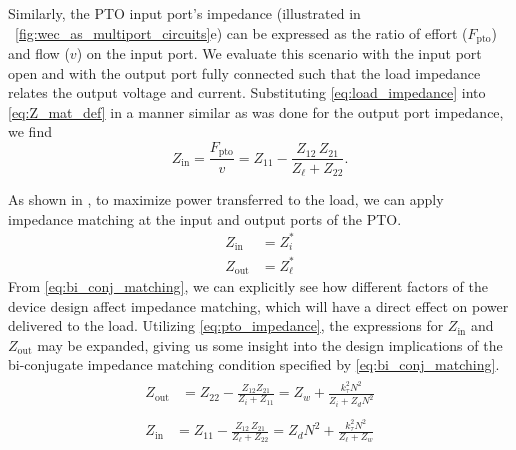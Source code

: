 \documentclass[twocolumn]{autart}
\begin{document}
Similarly, the PTO input port's impedance (illustrated in \figurename~\ref{fig:wec_as_multiport_circuits}e) can be expressed as the ratio of effort ($F_{\textrm{pto}}$) and flow ($v$) on the input port.
We evaluate this scenario with the input port open and with the output port fully connected such that the load impedance relates the output voltage and current.
Substituting \eqref{eq:load_impedance} into \eqref{eq:Z_mat_def} in a manner similar as was done for the output port impedance, we find
%
\begin{equation}
        Z_{\textrm{in}} = \frac{F_{\textrm{pto}}}{v}=  Z_{11} - \frac{Z_{12} \, Z_{21}}{Z_\ell + Z_{22}} .
        \label{eq:pto_input_port_impedance}
\end{equation}

As shown in  \cite{Bacelli:2021aa}, to maximize power transferred to the load, we can apply impedance matching at the input and output ports of the PTO.
%
\begin{subequations}
    \begin{align}
        Z_{\textrm{in}} &= Z_i^*  \label{eq:bi_conj_matching_in} \\ 
        Z_{\textrm{out}} &= Z_\ell^* \label{eq:bi_conj_matching_out}
    \end{align}
\label{eq:bi_conj_matching}%
\end{subequations}
%
From \eqref{eq:bi_conj_matching}, we can explicitly see how different factors of the device design affect impedance matching, which will have a direct effect on power delivered to the load.
Utilizing \eqref{eq:pto_impedance}, the expressions for $Z_{\textrm{in}}$ and $Z_{\textrm{out}}$ may be expanded, giving us some insight into the design implications of the bi-conjugate impedance matching condition specified by \eqref{eq:bi_conj_matching}.
%
\begin{subequations}
\begin{align}
        \begin{split}
                Z_{\textrm{out}} &=  Z_{22} - \frac{Z_{12} Z_{21}}{Z_{i} + Z_{11}} =  Z_w + \frac{k_\tau^2 N^2}{Z_i + Z_d N^2}
        \end{split}\label{eq:expanded_zin} \\[1em]
        \begin{split}
                Z_{\textrm{in}} &= Z_{11} - \frac{Z_{12} \, Z_{21}}{Z_\ell + Z_{22}}  = Z_d N^2 + \frac{k_\tau^2 N^2}{Z_\ell + Z_w}
        \end{split}\label{eq:expanded_zout}
\end{align}\label{eq:expanded_z}%
\end{subequations}
\end{document}
